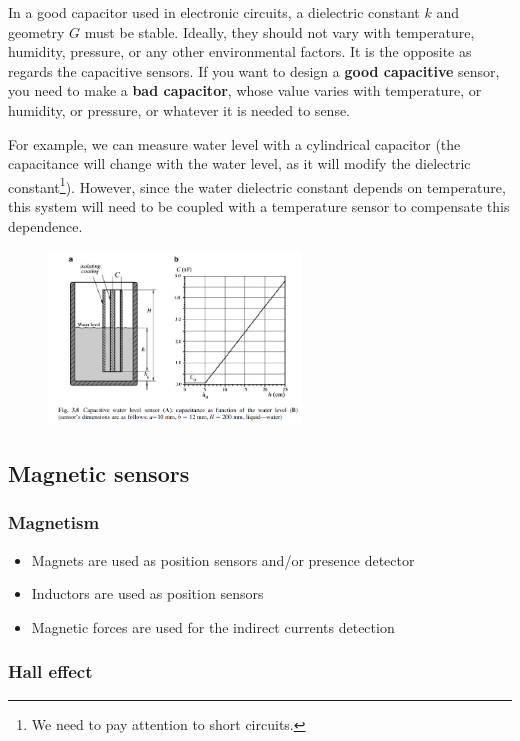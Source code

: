In a good capacitor used in electronic circuits, a dielectric constant $k$ and
geometry $G$ must be stable. Ideally, they should not vary with temperature,
humidity, pressure, or any other environmental factors. It is the opposite as regards the capacitive sensors. If you want to design a \textbf{good capacitive} sensor, you need to make a \textbf{bad capacitor}, whose
value varies with temperature, or humidity, or pressure, or whatever it is needed to
sense.

For example, we can measure water level with a cylindrical capacitor (the capacitance will change with the water level, as it will modify the dielectric constant\footnote{We need to pay attention to short circuits.}). However, since the water dielectric constant depends on temperature, this system will need to be coupled with a temperature sensor to compensate this dependence.
\begin{figure}[H]
    \centering
    \includegraphics[width = 0.6\textwidth]{L2/img/water-level.PNG}
\end{figure}

\subsection{Magnetic sensors}

\subsubsection{Magnetism}

\begin{itemize}
    \item Magnets are used as position sensors and/or presence detector
    \item Inductors are used as position sensors
    \item Magnetic forces are used for the indirect currents detection
\end{itemize}

\subsubsection{Hall effect}

